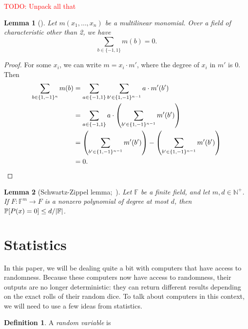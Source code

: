 \documentclass[english,12pt]{reedthesis}
\theoremstyle{plain}
\newtheorem{lemma}[lemma]{Lemma}
\theoremstyle{definition}
\newtheorem{defn}[defn]{Definition}
\theoremstyle{remark}
\DeclarePairedDelimiter{\abs}{\lvert}{\rvert}
\newcommand{\TODO}[1]{\textcolor{red}{TODO: #1}}
\begin{document}
\TODO{Unpack all that}

\begin{lemma}[{\cite[Lemma 7]{JKRS09}}]\label{lem:monomial-sum}
  Let $m(x_{1}, \ldots, x_{n})$ be a multilinear monomial. Over a field of
  characteristic other than 2, we have
  \begin{equation}
    \sum_{b \in \{-1, 1\}}m(b) = 0.
  \end{equation}
\end{lemma}

\begin{proof}
  For some $x_{i}$, we can write $m = x_{i} \cdot m'$, where the degree of $x_{i}$
  in $m'$ is 0. Then
  \begin{align*}
    \sum_{b \in \{1, -1\}^{n}}m(b)
    &= \sum_{a \in \{-1, 1\}}\sum_{b' \in \{1, -1\}^{n-1}}a \cdot m'(b') \\
    &= \sum_{a \in \{-1, 1\}} a \cdot \mleft(\sum_{b' \in \{1, -1\}^{n-1}} m'(b')\mright) \\
    &= \mleft(\sum_{b' \in \{1, -1\}^{n-1}} m'(b')\mright) - \mleft(\sum_{b' \in \{1, -1\}^{n-1}} m'(b')\mright) \\
    &= 0.
  \end{align*}
\end{proof}

\begin{lemma}[Schwartz-Zippel lemma;~\cite{Sch80,Zip79}]%
  \label{lem:schwartz-zippel}
  Let $\mathbb{F}$ be a finite field, and let $m, d \in \mathbb{N}^{+}$. If
  $F\colon \mathbb{F}^{m} \rightarrow F$ is a nonzero polynomial of degree at most $d$, then
  $\mathbb{P}[P(x) = 0] \le d/\abs{\mathbb{F}}$.
\end{lemma}

\section{Statistics}

In this paper, we will be dealing quite a bit with computers that have access to
randomness. Because these computers now have access to randomness, their outputs
are no longer deterministic: they can return different results depending on the
exact rolls of their random dice. To talk about computers in this context, we
will need to use a few ideas from statistics.

\begin{defn}\label{def:random-var}
  A \emph{random variable} is %
\end{defn}
\end{document}
